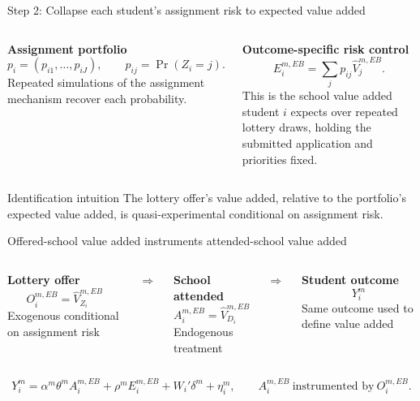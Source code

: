 \documentclass[11pt,aspectratio=169]{beamer}
\begin{document}
\begin{frame}{Step 2: Collapse each student's assignment risk to expected value added}
\small
\begin{columns}[T,onlytextwidth]
  \textbf{Assignment portfolio}
  \[
    p_i=(p_{i1},\ldots,p_{iJ}),
    \qquad
    p_{ij}=\Pr(Z_i=j).
  \]
  Repeated simulations of the assignment mechanism recover each probability.

  \textbf{Outcome-specific risk control}
  \[
    E_i^{m,EB}
    =
    \sum_j p_{ij}\widehat V_j^{m,EB}.
  \]
  This is the school value added student $i$ expects over repeated lottery draws, holding the submitted application and priorities fixed.
\end{columns}

\vspace{1em}
\begin{alertblock}{Identification intuition}
The lottery offer's value added, relative to the portfolio's expected value added, is quasi-experimental conditional on assignment risk.
\end{alertblock}
\end{frame}

\begin{frame}{Offered-school value added instruments attended-school value added}
\begin{columns}[c,onlytextwidth]
  \centering
  \textbf{Lottery offer}
  \[
    O_i^{m,EB}
    =
    \widehat V_{Z_i}^{m,EB}
  \]
  \footnotesize Exogenous conditional on assignment risk

  \centering
  $\Longrightarrow$

  \centering
  \textbf{School attended}
  \[
    A_i^{m,EB}
    =
    \widehat V_{D_i}^{m,EB}
  \]
  \footnotesize Endogenous treatment

  \centering
  $\Longrightarrow$

  \centering
  \textbf{Student outcome}
  \[
    Y_i^m
  \]
  \footnotesize Same outcome used to define value added
\end{columns}

\vspace{1.3em}
\[
  Y_i^m
  =
  \alpha^m
  \theta^m A_i^{m,EB}
  + \rho^m E_i^{m,EB}
  + W_i'\delta^m
  + \eta_i^m,
  \qquad
  A_i^{m,EB}\ \text{instrumented by}\ O_i^{m,EB}.
\]
\end{frame}
\end{document}

